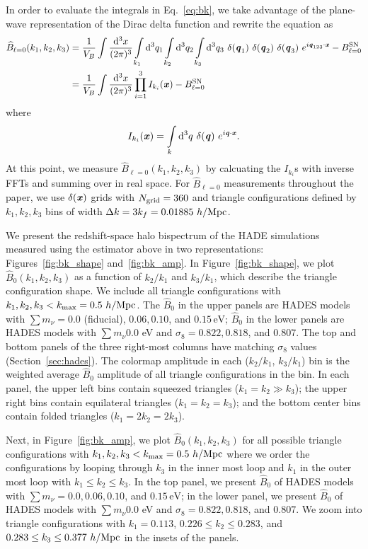 \documentclass[12pt, letterpaper, preprint]{aastex62}
\newcommand{\smnu}{\sum m_\nu}
\newcommand{\sig}{\sigma_8}
\newcommand{\BOk}{\widehat{B}_0}
\newcommand{\bfi}[1]{\textbf{\textit{#1}}}
\newcommand{\beq}{\begin{equation}}
\newcommand{\eeq}{\end{equation}}
\begin{document}
In order to evaluate the integrals in Eq.~\ref{eq:bk}, we take advantage of the plane-wave 
representation of the Dirac delta function and rewrite the equation as
\begin{align} \label{eq:bk2} 
    \widehat{B}_{\ell = 0}(k_1,k_2, k_3) &= \frac{1}{V_B} \int\frac{{\rm d}^3x}{(2\pi)^3} \int\limits_{k_1}{\rm d}^3q_1 \int\limits_{k_2}{\rm d}^3q_2 \int\limits_{k_3}{\rm d}^3q_3~\delta({\bfi q_1})~\delta({\bfi q_2})~\delta({\bfi q_3})~e^{i{\bfi q_{123}}\cdot{\bfi x}} - B^{\rm SN}_{\ell = 0}\\ 
    &= \frac{1}{V_B} \int\frac{{\rm d}^3x}{(2\pi)^3}\prod\limits_{i=1}^{3} I_{k_i}({\bfi x}) - B^{\rm SN}_{\ell = 0} 
\end{align}
where 
\beq
I_{k_i}({\bfi x}) = \int\limits_k {\rm d}^3q~\delta({\bfi q})~e^{i {\bfi q}\cdot{\bfi x}}. 
\eeq
At this point, we measure $\widehat{B}_{\ell = 0}(k_1, k_2, k_3)$ by calcuating the 
$I_{k_i}$s with inverse FFTs and summing over in real space. For $\widehat{B}_{\ell = 0}$
measurements throughout the paper, we use $\delta({\bfi x})$ grids with $N_{\rm grid} = 360$ 
and triangle configurations defined by $k_1, k_2, k_3$ bins of width 
$\Delta k = 3 k_f = 0.01885~h/{\rm Mpc}$.

We present the redshift-space halo bispectrum of the HADE simulations measured using 
the estimator above in two representations: Figures~\ref{fig:bk_shape} and~\ref{fig:bk_amp}. 
In Figure~\ref{fig:bk_shape}, we plot $\BOk(k_1, k_2, k_3)$ as a function of $k_2/k_1$ and $k_3/k_1$, 
which describe the triangle configuration shape. We include all triangle configurations with 
$k_1, k_2, k_3 < k_{\rm max} = 0.5~h/{\rm Mpc}$. The $\BOk$ in the upper
panels are HADES models with $\smnu = 0.0$ (fiducial), $0.06, 0.10$, and $0.15\,\mathrm{eV}$; 
$\BOk$ in the lower panels are  HADES models with $\smnu 0.0$ eV and $\sig = 0.822, 0.818$, 
and $0.807$. The top and bottom panels of the three right-most columns have matching $\sig$ 
values (Section~\ref{sec:hades}). The colormap amplitude in each ($k_2/k_1$, $k_3/k_1$) bin 
is the weighted average $\BOk$ amplitude of all triangle configurations in the bin. In each 
panel, the upper left bins contain squeezed triangles ($k_1 = k_2 \gg k_3$); the upper right 
bins contain equilateral triangles ($k_1 = k_2 = k_3$); and the bottom center bins contain 
folded triangles ($k_1 = 2 k_2 = 2 k_3$). 

Next, in Figure~\ref{fig:bk_amp}, we plot $\BOk(k_1, k_2, k_3)$ for all possible triangle 
configurations with $k_1, k_2, k_3 < k_{\rm max} = 0.5~h/{\rm Mpc}$ where we order the 
configurations by looping through $k_3$ in the inner most loop and $k_1$ in the outer most 
loop with $k_1 \leq k_2 \leq k_3$. In the top panel, we present $\BOk$ of HADES models 
with $\smnu = 0.0, 0.06, 0.10$, and $0.15\,\mathrm{eV}$; in the lower panel, we present 
$\BOk$ of HADES models with $\smnu 0.0$ eV and $\sig = 0.822, 0.818$, and $0.807$. We 
zoom into triangle configurations with $k_1 = 0.113$, $0.226 \leq k_2 \leq 0.283$, 
and $0.283 \leq k_3 \leq 0.377~h/{\rm Mpc}$ in the insets of the panels. 
\end{document}
